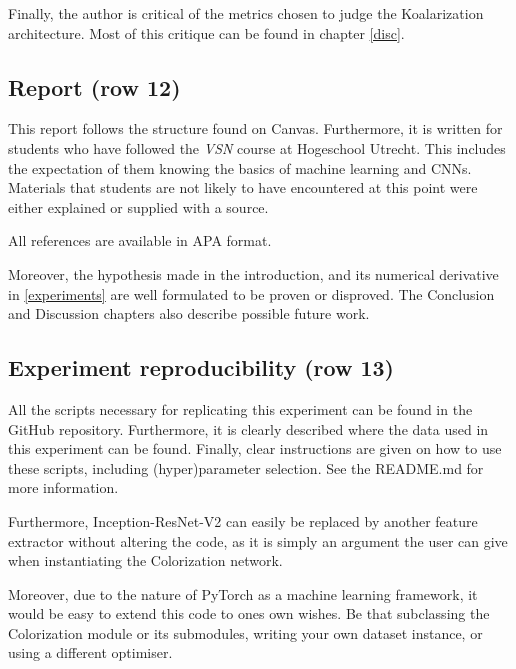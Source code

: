 \documentclass{article}
\begin{document}
        Finally, the author is critical of the metrics chosen to judge the Koalarization architecture. Most of this critique can be found in chapter \ref{disc}.
    
    \subsection{Report (row 12)}
        This report follows the structure found on Canvas. Furthermore, it is written for students who have followed the \textit{VSN} course at Hogeschool Utrecht. This includes the expectation of them knowing the basics of machine learning and CNNs. Materials that students are not likely to have encountered at this point were either explained or supplied with a source.
        
        All references are available in APA format.
        
        Moreover, the hypothesis made in the introduction, and its numerical derivative in \ref{experiments} are well formulated to be proven or disproved. The Conclusion and Discussion chapters also describe possible future work.
    
    \subsection{Experiment reproducibility (row 13)}
        All the scripts necessary for replicating this experiment can be found in the GitHub repository. Furthermore, it is clearly described where the data used in this experiment can be found. Finally, clear instructions are given on how to use these scripts, including (hyper)parameter selection. See the README.md for more information.
        
        Furthermore, Inception-ResNet-V2 can easily be replaced by another feature extractor without altering the code, as it is simply an argument the user can give when instantiating the Colorization network.
        
        Moreover, due to the nature of PyTorch as a machine learning framework, it would be easy to extend this code to ones own wishes. Be that subclassing the Colorization module or its submodules, writing your own dataset instance, or using a different optimiser. 
    
\end{document}
